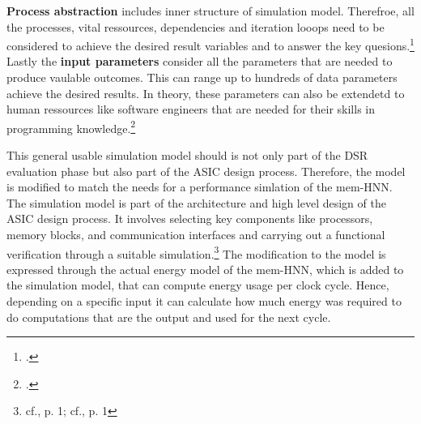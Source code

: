 \textbf{Process abstraction} includes inner structure of simulation model.
Therefroe, all the processes, vital ressources, dependencies and iteration looops need to be considered to achieve the desired result variables and to answer the key quesions.\footcite[cf.][97]{kellnerSoftwareProcessSimulation1999}
Lastly the \textbf{input parameters} consider all the parameters that are needed to produce vaulable outcomes. 
This can range up to hundreds of data parameters achieve the desired results. 
In theory, these parameters can also be extendetd to human ressources like software engineers that are needed for their skills in programming knowledge.\footcite[cf.][97-98]{kellnerSoftwareProcessSimulation1999}

This general usable simulation model should is not only part of the \ac{DSR} evaluation phase but also part of the \ac{ASIC} design process. 
Therefore, the model is modified to match the needs for a performance simlation of the \ac{mem-HNN}.
The simulation model is part of the architecture and high level design of the \ac{ASIC} design process.
It involves selecting key components like processors, memory blocks, and communication interfaces and carrying out a functional verification through a suitable simulation.\footnote{cf.\cite{raoUltimateGuideASIC}, p. 1; cf.\cite{ASICDesignFlow}, p. 1}
The modification to the model is expressed through the actual energy model of the \ac{mem-HNN}, which is added to the simulation model, that can compute energy usage per clock cycle. 
Hence, depending on a specific input it can calculate how much energy was required to do computations that are the output and used for the next cycle. 
